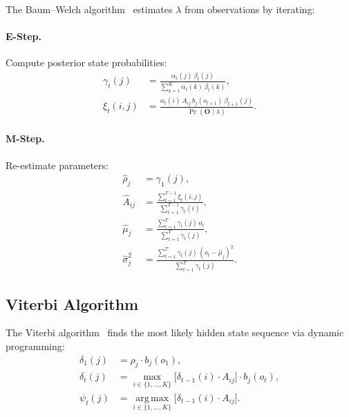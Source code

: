 \documentclass[12pt,a4paper]{article}
\newcommand{\argmax}{\operatorname*{arg\,max}}
\begin{document}
The Baum--Welch algorithm~\cite{baum1970} estimates $\lambda$ from observations by iterating:

\paragraph{E-Step.} Compute posterior state probabilities:
\begin{align}
    \gamma_t(j) &= \frac{\alpha_t(j)\,\beta_t(j)}{\sum_{k=1}^K \alpha_t(k)\,\beta_t(k)},
    \label{eq:gamma} \\
    \xi_t(i, j) &= \frac{\alpha_t(i)\, A_{ij}\, b_j(o_{t+1})\, \beta_{t+1}(j)}
                        {\Pr(\bm{O} \mid \lambda)}.
    \label{eq:xi}
\end{align}

\paragraph{M-Step.} Re-estimate parameters:
\begin{align}
    \hat{\rho}_j &= \gamma_1(j), \label{eq:bw-pi} \\
    \hat{A}_{ij} &= \frac{\sum_{t=1}^{T-1} \xi_t(i,j)}{\sum_{t=1}^{T-1} \gamma_t(i)},
    \label{eq:bw-A} \\
    \hat{\mu}_j &= \frac{\sum_{t=1}^{T} \gamma_t(j)\, o_t}{\sum_{t=1}^{T} \gamma_t(j)},
    \label{eq:bw-mu} \\
    \hat{\sigma}_j^2 &= \frac{\sum_{t=1}^{T} \gamma_t(j)\,(o_t - \hat{\mu}_j)^2}
                             {\sum_{t=1}^{T} \gamma_t(j)}.
    \label{eq:bw-sigma}
\end{align}

\subsection{Viterbi Algorithm}
\label{sec:viterbi}

The Viterbi algorithm~\cite{viterbi1967} finds the most likely hidden state sequence via dynamic programming:
\begin{align}
    \delta_1(j) &= \rho_j \cdot b_j(o_1), \label{eq:viterbi-init} \\
    \delta_t(j) &= \max_{i \in \{1,\ldots,K\}} \bigl[\delta_{t-1}(i) \cdot A_{ij}\bigr] \cdot b_j(o_t),
    \label{eq:viterbi-recur} \\
    \psi_t(j) &= \argmax_{i \in \{1,\ldots,K\}} \bigl[\delta_{t-1}(i) \cdot A_{ij}\bigr].
    \label{eq:viterbi-backptr}
\end{align}
\end{document}
